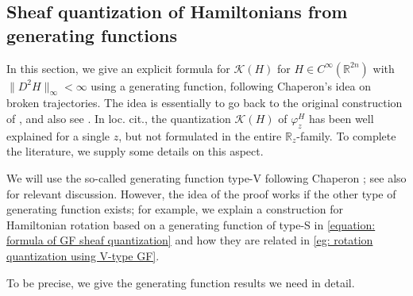 \documentclass[11pt]{amsart}
\numberwithin{equation}{section}
\theoremstyle{plain}
\theoremstyle{definition}
\theoremstyle{remark}
\newcommand{\bR} { {\mathbb{R}}}
\newcommand{\cK} { {\mathcal{K}}}
\begin{document}
\subsection{Sheaf quantization of Hamiltonians from generating functions}\label{appendix:generating function}

In this section, we give an explicit formula for $\cK(H)$ for $H\in C^\infty(\bR^{2n})$ with $\|D^2H\|_\infty<\infty$ using a generating function, following Chaperon's idea on broken trajectories. The idea is essentially to go back to the original construction of \cite{tamarkin2013}, and also see \cite[Proposition 10.4]{Viterbo_Princeton_Lecture}. In loc. cit., the quantization $\cK(H)$ of $\varphi_z^H$ has been well explained for a single $z$, but not formulated in the entire $\bR_z$-family. To complete the literature, we supply some details on this aspect. 

We will use the so-called generating function type-V following Chaperon \cite{Chaperon1984}; see also \cite[Section 9.2]{mcduff2017introST} for relevant discussion. However, the idea of the proof works if the other type of generating function exists; for example, we explain a construction for Hamiltonian rotation based on a generating function of type-S in \autoref{equation: formula of GF sheaf quantization} and how they are related in \autoref{eg: rotation quantization using V-type GF}. 

To be precise, we give the generating function results we need in detail.
\end{document}
